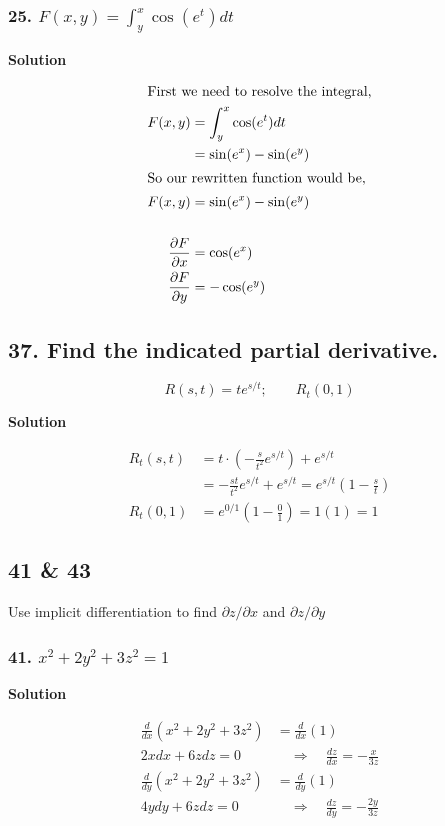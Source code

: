 \documentclass{article}
\newcommand\rr{\quad\Rightarrow\quad}
\newcommand{\solution}{\centerline{\textbf{Solution}}}
\begin{document}
\subsubsection*{25. $F(x,y) = \int_y^x \cos (e^t) dt$}
\solution
\begin{align*}
    \intertext{First we need to resolve the integral,}
    F(x,y) &= \int_y^x \cos (e^t) dt \\
           &= \sin (e^x) - \sin (e^y) \\
    \intertext{So our rewritten function would be,}
    F(x,y) &= \sin (e^x) - \sin (e^y) \\\\
    \frac{\partial F}{\partial x} &= \cos (e^x) \\
    \frac{\partial F}{\partial y} &= -\cos (e^y) 
\end{align*}
\subsection*{37. Find the indicated partial derivative.}
\[
    R(s,t) = te^{s/t}; \qquad R_t (0,1)
\]
\solution
\begin{align*}
    R_t(s,t) &= t\cdot\left(-\displaystyle\frac s {t^2} e^{s/t}\right) + e^{s/t} \\
             &= -\displaystyle\frac{st}{t^2}e^{s/t} + e^{s/t} = e^{s/t} \left( 1 - \frac s t\right) \\
    R_t(0,1) &= e^{0/1}(1-\frac 0 1) = 1(1) = 1
\end{align*}
\subsection*{41 \& 43}
Use implicit differentiation to find $\partial z / \partial x$ and $\partial z / \partial y$
\subsubsection*{41. $x^2 + 2y^2 + 3z^2 = 1$}
\solution
\begin{align*}
    \frac d {dx} (x^2+2y^2+3z^2) &= \frac d {dx} (1) \\
    2xdx + 6zdz = 0 &\rr \frac{dz}{dx} = -\frac x {3z} \\
    \frac d {dy} (x^2+2y^2+3z^2) &= \frac d {dy} (1) \\
    4ydy + 6zdz = 0 &\rr \frac{dz}{dy} = -\frac{2y}{3z} 
\end{align*}
\end{document}
